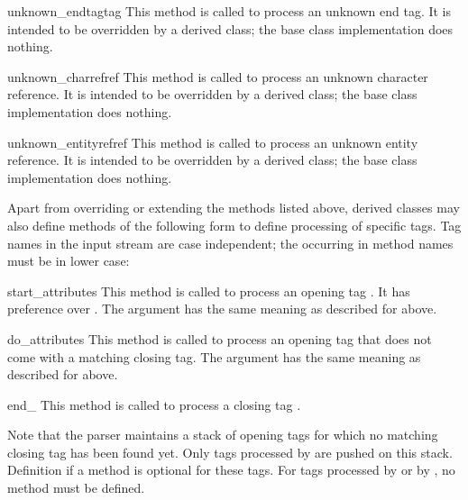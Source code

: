 \begin{funcdesc}{unknown_endtag}{tag}
This method is called to process an unknown end tag.  It is intended
to be overridden by a derived class; the base class implementation
does nothing.
\end{funcdesc}

\begin{funcdesc}{unknown_charref}{ref}
This method is called to process an unknown character reference.  It
is intended to be overridden by a derived class; the base class
implementation does nothing.
\end{funcdesc}

\begin{funcdesc}{unknown_entityref}{ref}
This method is called to process an unknown entity reference.  It is
intended to be overridden by a derived class; the base class
implementation does nothing.
\end{funcdesc}

Apart from overriding or extending the methods listed above, derived
classes may also define methods of the following form to define
processing of specific tags.  Tag names in the input stream are case
independent; the  occurring in method names must be in lower
case:

\begin{funcdesc}{start_}{attributes}
This method is called to process an opening tag .  It has
preference over .  The  argument
has the same meaning as described for  above.
\end{funcdesc}

\begin{funcdesc}{do_}{attributes}
This method is called to process an opening tag  that does
not come with a matching closing tag.  The  argument
has the same meaning as described for  above.
\end{funcdesc}

\begin{funcdesc}{end_}{}
This method is called to process a closing tag .
\end{funcdesc}

Note that the parser maintains a stack of opening tags for which no
matching closing tag has been found yet.  Only tags processed by
 are pushed on this stack.  Definition if a
 method is optional for these tags.  For tags
processed by  or by , no
 method must be defined.
